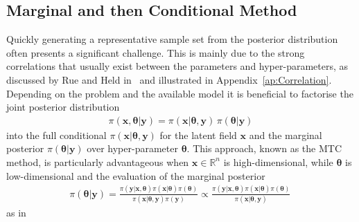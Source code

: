 \subsection{Marginal and then Conditional Method}
\label{subsec:TheoMTC}
Quickly generating a representative sample set from the posterior distribution often presents a significant challenge. %
This is mainly due to the strong correlations that usually exist between the parameters and hyper-parameters, as discussed by Rue and Held in~\cite{rue2005gaussian} and illustrated in Appendix~\ref{ap:Correlation}.
Depending on the problem and the available model it is beneficial to factorise the joint posterior distribution
\begin{align}
	\pi(\bm{x}, \bm{\theta} |  \bm{y}) = \pi(\bm{x} |  \bm{\theta}, \bm{y}) \, \pi(\bm{\theta} |   \bm{y}) \label{eq:MTC}
\end{align}
into the full conditional $\pi(\bm{x} |  \bm{\theta}, \bm{y})$ for the latent field $\bm{x}$ and the marginal posterior $ \pi(\bm{\theta} |   \bm{y})$ over hyper-parameter $\bm{\theta}$.
This approach, known as the MTC method, is particularly advantageous when $\bm{x}\in \mathbb{R}^n$ is high-dimensional, while $\bm{\theta}$ is low-dimensional and the evaluation of the marginal posterior
\begin{align}
	\pi(\bm{\theta} |   \bm{y}) =  \frac{ \pi(   \bm{y} | \bm{x},\bm{\theta})  \pi( \bm{x} | \bm{\theta} )  \pi(\bm{\theta}) }{ \pi(\bm{x} | \bm{\theta} ,   \bm{y})   \pi( \bm{y})} \propto \frac{ \pi(   \bm{y} | \bm{x},\bm{\theta})  \pi( \bm{x} | \bm{\theta} )  \pi(\bm{\theta}) }{ \pi(\bm{x} | \bm{\theta} ,   \bm{y}) } \label{eq:margGen}\, 
\end{align}
as in~\cite[Lemma 2]{fox2016fast} 
